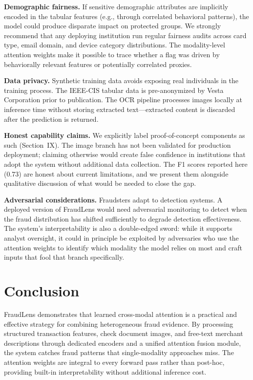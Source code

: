 \documentclass[10pt,conference,letterpaper]{IEEEtran}
\begin{document}
\textbf{Demographic fairness.} If sensitive demographic attributes are implicitly encoded
in the tabular features (e.g., through correlated behavioral patterns), the model could
produce disparate impact on protected groups. We strongly recommend that any deploying
institution run regular fairness audits across card type, email domain, and device
category distributions. The modality-level attention weights make it possible to trace
whether a flag was driven by behaviorally relevant features or potentially correlated
proxies.

\textbf{Data privacy.} Synthetic training data avoids exposing real individuals in the
training process. The IEEE-CIS tabular data is pre-anonymized by Vesta Corporation prior
to publication. The OCR pipeline processes images locally at inference time without
storing extracted text---extracted content is discarded after the prediction is returned.

\textbf{Honest capability claims.} We explicitly label proof-of-concept components as
such (Section~IX). The image branch has not been validated for production deployment;
claiming otherwise would create false confidence in institutions that adopt the system
without additional data collection. The F1 scores reported here (0.73) are honest about
current limitations, and we present them alongside qualitative discussion of what would
be needed to close the gap.

\textbf{Adversarial considerations.} Fraudsters adapt to detection systems. A deployed
version of FraudLens would need adversarial monitoring to detect when the fraud
distribution has shifted sufficiently to degrade detection effectiveness. The system's
interpretability is also a double-edged sword: while it supports analyst oversight,
it could in principle be exploited by adversaries who use the attention weights to
identify which modality the model relies on most and craft inputs that fool that branch
specifically.

\section{Conclusion}

FraudLens demonstrates that learned cross-modal attention is a practical and effective
strategy for combining heterogeneous fraud evidence. By processing structured transaction
features, check document images, and free-text merchant descriptions through dedicated
encoders and a unified attention fusion module, the system catches fraud patterns that
single-modality approaches miss. The attention weights are integral to every forward pass
rather than post-hoc, providing built-in interpretability without additional inference
cost.
\end{document}

